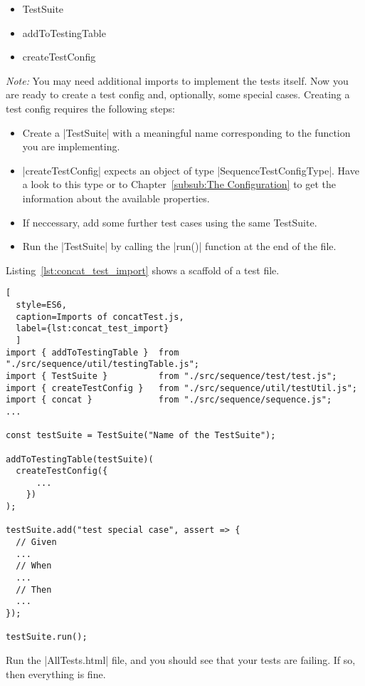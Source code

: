 \begin{itemize}
  \item{TestSuite}
  \item{addToTestingTable}
  \item{createTestConfig}
\end{itemize}

\textit{Note:} You may need additional imports to implement the tests itself.
\newline
Now you are ready to create a test config and, optionally, some special cases.
Creating a test config requires the following steps:

\begin{itemize}
  \item{Create a |TestSuite| with a meaningful name corresponding to the function you are implementing.}
  \item{|createTestConfig| expects an object of type |SequenceTestConfigType|. Have a look
    to this type or to Chapter~\ref{subsub:The Configuration} to get the information about the available properties. }
      \item{If neccessary, add some further test cases using the same TestSuite.}
  \item{Run the |TestSuite| by calling the |run()| function at the end of the file. }
\end{itemize}

Listing~\ref{lst:concat_test_import} shows a scaffold of a test file. 

\begin{lstlisting}[
  style=ES6, 
  caption=Imports of concatTest.js,
  label={lst:concat_test_import}
  ]
import { addToTestingTable }  from "./src/sequence/util/testingTable.js";
import { TestSuite }          from "./src/sequence/test/test.js";
import { createTestConfig }   from "./src/sequence/util/testUtil.js";
import { concat }             from "./src/sequence/sequence.js";
...

const testSuite = TestSuite("Name of the TestSuite");

addToTestingTable(testSuite)(
  createTestConfig({
      ...
    })
);

testSuite.add("test special case", assert => {
  // Given
  ...
  // When
  ...
  // Then
  ...
});

testSuite.run();
\end{lstlisting}

Run the |AllTests.html| file, and you should see that your tests are failing.
If so, then everything is fine.

